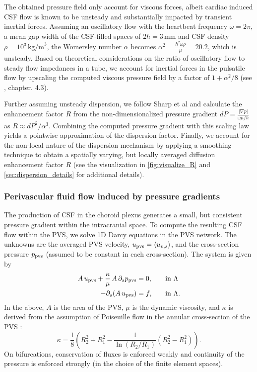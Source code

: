 The obtained pressure field only account for viscous forces, albeit cardiac induced CSF flow is known to be unsteady and substantially impacted by transient inertial forces. Assuming an oscillatory flow with the heartbeat frequency $\omega = 2 \pi$, a mean gap width of the CSF-filled spaces of $2h=3$\,mm and CSF density $\rho=10^3\,\text{kg/m}^3$, the Womersley number $\alpha$ becomes $\alpha^2 = \frac{h^2 \omega \rho}{\mu} = 20.2$, which is unsteady. Based on theoretical considerations on the ratio of oscillatory flow to steady flow impedances in a tube, we account for inertial forces in the pulsatile flow by upscaling the computed viscous pressure field by a factor of $1 + \alpha^2 / 8$ (see \cite{van1998cardiovascular}, chapter. 4.3).

Further assuming unsteady dispersion, we follow Sharp et al \cite{keith2019dispersion} and calculate the enhancement factor $R$ from the non-dimensionalized pressure gradient $dP=\frac{|\nabla p|}{\omega \mu / h}$ as $R\approx dP^2 / \alpha^3$. Combining the computed pressure gradient with this scaling law yields a pointwise approximation of the dispersion factor. Finally, we account for the non-local nature of the dispersion mechanism by applying a smoothing technique to obtain a spatially varying, but locally averaged diffusion enhancement factor $R$ (see the visualization in \cref{fig:visualize_R} and \cref{sec:dispersion_details} for additional details).


\subsubsection{Perivascular fluid flow induced by pressure gradients}

The production of CSF in the choroid plexus generates a small, but consistent pressure gradient within the intracranial space. To compute the resulting CSF flow within the PVS, we solve 1D Darcy equations in the PVS network. The unknowns are the averaged PVS velocity, $u_{\rm pvs} = \langle u_{v,s} \rangle$, and the cross-section pressure $p_{\rm pvs} $ (assumed to be constant in each cross-section). The system is given by  \cite{daversin2022geometrically, gjerde2024directional} 
\begin{alignat}{2}
A \,  u_{\rm pvs}   + \frac{\kappa}{\mu} \, A \, \partial_{s} p_{\rm pvs} & = 0, &&  \quad \rm in  \,\, \Lambda  \\ 
-\partial_s (A \, u_{\rm pvs}) & = f, && \quad \rm in  \,\, \Lambda .  
\end{alignat} 
In the above, $A$ is the area of the PVS, $\mu$ is the dynamic viscosity, and $\kappa$ is derived from the assumption of Poiseuille
flow in the annular cross-section of the PVS \cite{daversin2022geometrically,tithof2022network}: 
\begin{equation}
\kappa = \frac18 \left( R_2^2 + R_1^2 - \frac{1}{\ln(R_2/R_1)} (R_2^2- R_1^2) \right). 
\end{equation}
On bifurcations, conservation of fluxes is enforced weakly and continuity of the pressure is enforced strongly (in the choice of the finite element spaces). 

